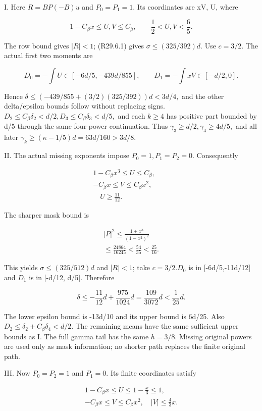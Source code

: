 I. Here \(R=BP(-B)u\) and \(P_0=P_1=1.\) Its coordinates are xV, U,
where

\[
1-C_\beta x\le U,V\le C_\beta,\qquad \frac12<U,V<\frac65.
\]

The row bound gives |\(R|<1\); (R29.6.1) gives
\(\sigma\le (325/392)d.\) Use \(c=3/2.\) The actual first two moments are

\[
D_0=-\int U\in[-6d/5,-439d/855],\qquad
D_1=-\int xV\in[-d/2,0].
\]

Hence \(\delta\le (-439/855+(3/2)(325/392))d<3d/4,\allowbreak \)
and the other delta/epsilon bounds follow without replacing signs.
\(D_2\le C_\beta \delta_2<d/2,\allowbreak  D_3\le C_\beta \delta_3<d/5,\allowbreak \) and each \(k\ge 4\)
has positive part bounded by d/5 through the same four-power
continuation. Thus \(\gamma_3\ge d/2,\allowbreak  \gamma_4\ge 4d/5,\allowbreak \) and all later
\(\gamma_k\ge (\kappa-1/5)d=63d/160>3d/8.\)

II. The actual missing exponents impose \(P_0=1,\allowbreak  P_1=P_2=0.\)
Consequently

\[
\begin{gathered}
1-C_\beta x^3\le U\le C_\beta,\qquad\\
-C_\beta x\le V\le C_\beta x^2,\\
\quad U\ge\frac{11}{12}.
\end{gathered}
\]

The sharper mask bound is

\[
\begin{gathered}
|P|^2\le\frac{1+x^3}{(1-x^2)^2}\\
\le\frac{24864}{16245}<\frac{54}{35}<\frac{25}{16}.
\end{gathered}
\]

This yields \(\sigma\le (325/512)d\) and |\(R|<1\); take \(c=3/2. D_0\) is in [-6d/5,-11d/12] and
\(D_1\) is in [-d/12, d/5]. Therefore

\[
\delta\le-\frac{11}{12}d+\frac{975}{1024}d
=\frac{109}{3072}d<\frac1{25}d.
\]

The lower epsilon bound is -13d/10 and its upper bound is 6d/25.
Also \(D_2\le \delta_2+C_\beta \delta_4<d/2.\) The remaining means have
the same sufficient upper bounds as I. The full gamma tail has
the same \(h=3/8.\) Missing original powers are used only as mask
information; no shorter path replaces the finite original path.

III. Now \(P_0=P_2=1\) and \(P_1=0.\) Its finite coordinates satisfy

\[
\begin{gathered}
1-C_\beta x\le U\le1-\frac x3\le1,\quad\\
-C_\beta x\le V\le C_\beta x^2,\quad |V|\le\frac43x.
\end{gathered}
\]

